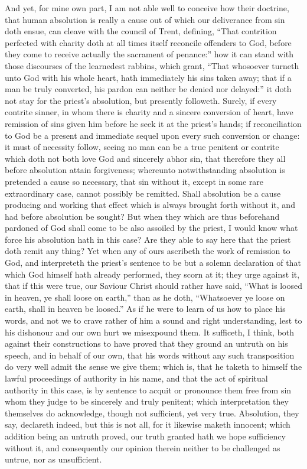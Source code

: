 And yet, for mine own part, I am not able well to conceive how their doctrine, that human absolution is really a cause out of which our deliverance from sin doth ensue, can cleave with the council of Trent, defining, “That contrition perfected with charity doth at all times itself reconcile offenders to God, before they come to receive actually the sacrament of penance:” how it can stand with those discourses of the learnedest rabbins, which grant, “That whosoever turneth unto God with his whole heart, hath immediately his sins taken away; that if a man be truly converted, his pardon can neither be denied nor delayed:” it doth not stay for the priest’s absolution, but presently followeth. Surely, if every contrite sinner, in whom there is charity and a sincere conversion of heart, have remission of sins given him before he seek it at the priest’s hands; if reconciliation to God be a present and immediate sequel upon every such conversion or change: it must of necessity follow, seeing no man can be a true penitent or contrite which doth not both love God and sincerely abhor sin, that therefore they all before absolution attain forgiveness; whereunto notwithstanding absolution is pretended a cause so necessary, that sin without it, except in some rare extraordinary case, cannot possibly be remitted. Shall absolution be a cause producing and working that effect which is always brought forth without it, and had before absolution be sought? But when they which are thus beforehand pardoned of God shall come to be also assoiled by the  priest, I would know what force his absolution hath in this case? Are they able to say here that the priest doth remit any thing? Yet when any of ours ascribeth the work of remission to God, and interpreteth the priest’s sentence to be but a solemn declaration of that which God himself hath already performed, they scorn at it; they urge against it, that if this were true, our Saviour Christ should rather have said, “What is loosed in heaven, ye shall loose on earth,” than as he doth, “Whatsoever ye loose on earth, shall in heaven be loosed.” As if he were to learn of us how to place his words, and not we to crave rather of him a sound and right understanding, lest to his dishonour and our own hurt we misexpound them. It sufficeth, I think, both against their constructions to have proved that they ground an untruth on his speech, and in behalf of our own, that his words without any such transposition do very well admit the sense we give them; which is, that he taketh to himself the lawful proceedings of authority in his name, and that the act of spiritual authority in this case, is by sentence to acquit or pronounce them free from sin whom they judge to be sincerely and truly penitent; which interpretation they themselves do acknowledge, though not sufficient, yet very true. Absolution, they say, declareth indeed, but this is not all, for it likewise maketh innocent; which addition being an untruth proved, our truth granted hath we hope sufficiency without it, and consequently our opinion therein neither to be challenged as untrue, nor as unsufficient.

